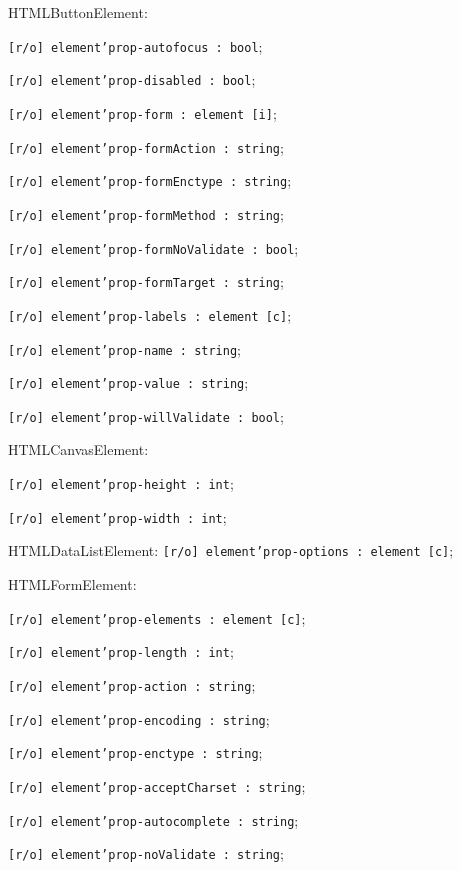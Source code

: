 \begin{icItems}
	\item HTMLButtonElement:
	\begin{icItems}
		\item \texttt{[r/o] element'prop-autofocus : bool};
		\item \texttt{[r/o] element'prop-disabled : bool};
		\item \texttt{[r/o] element'prop-form : element [i]};
		\item \texttt{[r/o] element'prop-formAction : string};
		\item \texttt{[r/o] element'prop-formEnctype : string};
		\item \texttt{[r/o] element'prop-formMethod : string};
		\item \texttt{[r/o] element'prop-formNoValidate : bool};
		\item \texttt{[r/o] element'prop-formTarget : string};
		\item \texttt{[r/o] element'prop-labels : element [c]};
		\item \texttt{[r/o] element'prop-name : string};
		\item \texttt{[r/o] element'prop-value : string};
		\item \texttt{[r/o] element'prop-willValidate  : bool};
	\end{icItems}
	
	\item HTMLCanvasElement:
	\begin{icItems}
		\item \texttt{[r/o] element'prop-height : int};
		\item \texttt{[r/o] element'prop-width : int};
	\end{icItems}
	
	\item HTMLDataListElement: \texttt{[r/o] element'prop-options : element [c]};
	
	\item HTMLFormElement:
	\begin{icItems}
		\item \texttt{[r/o] element'prop-elements : element [c]};
		\item \texttt{[r/o] element'prop-length : int};
		\item \texttt{[r/o] element'prop-action : string};
		\item \texttt{[r/o] element'prop-encoding : string};
		\item \texttt{[r/o] element'prop-enctype : string};
		\item \texttt{[r/o] element'prop-acceptCharset : string};
		\item \texttt{[r/o] element'prop-autocomplete : string};
		\item \texttt{[r/o] element'prop-noValidate : string};
	\end{icItems}
	

\end{icItems}

